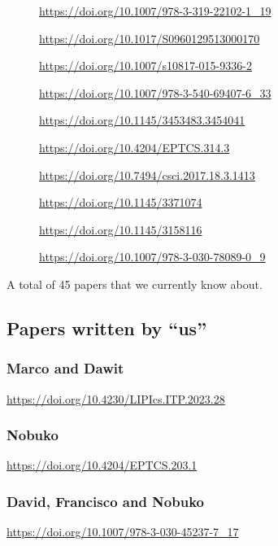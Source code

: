 \begin{description}
\item[\cite{Maksimovic2015}]              \url{https://doi.org/10.1007/978-3-319-22102-1_19}
\item[\cite{Parrow2014}]                  \url{https://doi.org/10.1017/S0960129513000170}
\item[\cite{Bengtson2016}]                \url{https://doi.org/10.1007/s10817-015-9336-2}
\item[\cite{Kahsai2008}]                  \url{https://doi.org/10.1007/978-3-540-69407-6_33}
\item[\cite{Castro-Perez2021}]            \url{https://doi.org/10.1145/3453483.3454041}
\item[\cite{Gay2020}]                     \url{https://doi.org/10.4204/EPTCS.314.3}
\item[\cite{Brady2017}]                   \url{https://doi.org/10.7494/csci.2017.18.3.1413}
\item[\cite{Hinrichsen2019}]              \url{https://doi.org/10.1145/3371074}
\item[\cite{Sergey2017}]                  \url{https://doi.org/10.1145/3158116}
\item[\cite{DBLP:conf/forte/ZalakainD21}] \url{https://doi.org/10.1007/978-3-030-78089-0_9}
\end{description}

A total of 45 papers that we currently know about.

\subsection{Papers written by ``us''}
\subsubsection{Marco and Dawit}
\cite{Tirore:2023} \url{https://doi.org/10.4230/LIPIcs.ITP.2023.28}

\subsubsection{Nobuko}
\cite{Orchard2016} \url{https://doi.org/10.4204/EPTCS.203.1}

\subsubsection{David, Francisco and Nobuko}
\cite{Castro2020} \url{https://doi.org/10.1007/978-3-030-45237-7_17}

